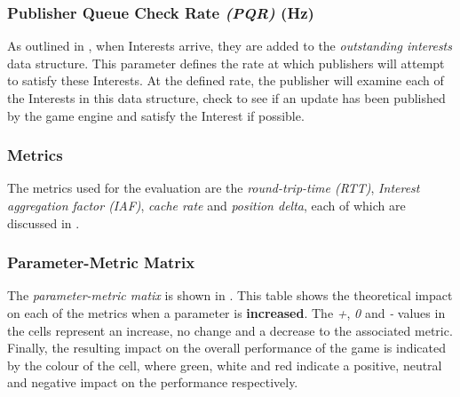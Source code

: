 \subsubsection*{Publisher Queue Check Rate \textit{(PQR)} (Hz)}
As outlined in , when Interests arrive, they are added to the \textit{outstanding interests} data structure. This parameter defines the rate at which publishers will attempt to satisfy these Interests. At the defined rate, the publisher will examine each of the Interests in this data structure, check to see if an update has been published by the game engine and satisfy the Interest if possible. 

\subsubsection*{Metrics}
The metrics used for the evaluation are the \textit{round-trip-time (RTT)}, \textit{Interest aggregation factor (IAF)}, \textit{cache rate} and \textit{position delta}, each of which are discussed in .

\subsubsection*{Parameter-Metric Matrix}
The \textit{parameter-metric matix} is shown in . This table shows the theoretical impact on each of the metrics when a parameter is \textbf{increased}. The \textit{+}, \textit{0} and \textit{-} values in the cells represent an increase, no change and a decrease to the associated metric. Finally, the resulting impact on the overall performance of the game is indicated by the colour of the cell, where green, white and red indicate a positive, neutral and negative impact on the performance respectively. 

